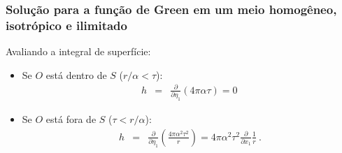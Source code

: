 \documentclass[xcolor=table]{beamer}
\begin{document}
\begin{frame}
\frametitle{\textbf{Solu\c{c}\~ao para a fun\c{c}\~ao de Green em um meio homog\^eneo, isotr\'opico e ilimitado}}
\begin{flushleft}
   \textcolor{red!60!black}{Avaliando a integral de superf\'icie:}
\end{flushleft}

\begin{itemize}
 \item Se $O$ est\'a dentro de $S$ ($ r/\alpha < \tau $):
 \begin{eqnarray}
  \label{ten1}
    h &=& \frac{\partial}{\partial \eta_1} \left(  4\pi \alpha \tau \right) = 0\, 
\end{eqnarray}
 \item Se $O$ est\'a fora de $S$ ($  \tau < r/\alpha $):
  \begin{eqnarray}
  \label{ten1}
    h &=& \frac{\partial}{\partial \eta_1} \left(  \frac{4\pi \alpha^2 \tau^2}{r} \right) =  4\pi \alpha^2 \tau^2 \frac{\partial}{\partial x_1} \frac{1}{r}\ .   
\end{eqnarray}
\end{itemize}

\end{frame}%
\end{document}
